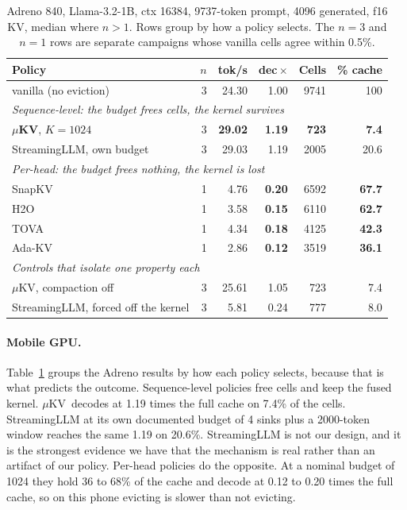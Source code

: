 \documentclass[sigconf, anonymous=false, screen=true, 10pt]{acmart}
\newcommand{\good}[1]{\textcolor{kvgreen}{\textbf{#1}}}
\newcommand{\bad}[1]{\textcolor{kvred}{\textbf{#1}}}
\newcommand{\muKV}{$\mu$KV}
\begin{document}
\begin{table}[tb]
\caption{Adreno 840, Llama-3.2-1B, ctx 16384, 9737-token prompt, 4096 generated, f16 KV, median where $n>1$. Rows group by how a policy selects. The $n{=}3$ and $n{=}1$ rows are separate campaigns whose vanilla cells agree within 0.5\%.}
\label{tab:gpu}
\centering\footnotesize
\setlength{\tabcolsep}{3.2pt}
\begin{tabular}{l r r r r r}
\toprule
\textbf{Policy} & \textbf{$n$} & \textbf{tok/s} & \textbf{dec\,$\times$} & \textbf{Cells} & \textbf{\% cache} \\
\midrule
vanilla (no eviction) & 3 & 24.30 & 1.00 & 9741 & 100 \\
\midrule
\multicolumn{6}{l}{\emph{Sequence-level: the budget frees cells, the kernel survives}} \\
\textbf{\muKV}, $K{=}1024$ & 3 & \good{29.02} & \good{1.19} & \good{723} & \good{7.4} \\
StreamingLLM, own budget & 3 & 29.03 & 1.19 & 2005 & 20.6 \\
\midrule
\multicolumn{6}{l}{\emph{Per-head: the budget frees nothing, the kernel is lost}} \\
SnapKV & 1 & 4.76 & \bad{0.20} & 6592 & \bad{67.7} \\
H2O    & 1 & 3.58 & \bad{0.15} & 6110 & \bad{62.7} \\
TOVA   & 1 & 4.34 & \bad{0.18} & 4125 & \bad{42.3} \\
Ada-KV & 1 & 2.86 & \bad{0.12} & 3519 & \bad{36.1} \\
\midrule
\multicolumn{6}{l}{\emph{Controls that isolate one property each}} \\
\muKV, compaction off & 3 & 25.61 & 1.05 & 723 & 7.4 \\
StreamingLLM, forced off the kernel & 3 & 5.81 & 0.24 & 777 & 8.0 \\
\bottomrule
\end{tabular}
\end{table}

\paragraph{Mobile GPU.} Table~\ref{tab:gpu} groups the Adreno results by how each policy selects, because that is what predicts the outcome. Sequence-level policies free cells and keep the fused kernel. \muKV\ decodes at 1.19 times the full cache on 7.4\% of the cells. StreamingLLM at its own documented budget of 4 sinks plus a 2000-token window reaches the same 1.19 on 20.6\%. StreamingLLM is not our design, and it is the strongest evidence we have that the mechanism is real rather than an artifact of our policy. Per-head policies do the opposite. At a nominal budget of 1024 they hold 36 to 68\% of the cache and decode at 0.12 to 0.20 times the full cache, so on this phone evicting is slower than not evicting.
\end{document}
